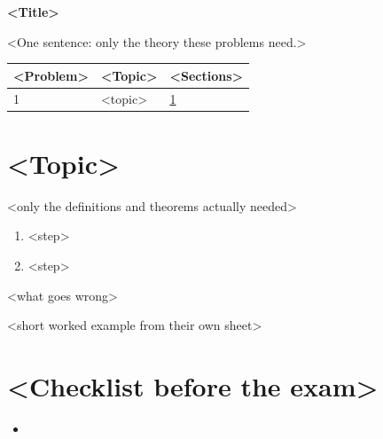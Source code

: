 \documentclass[11pt,a4paper]{article}
\begin{document}
{\LARGE\bfseries\sffamily\color{accent} <Title>}\par\smallskip
<One sentence: only the theory these problems need.>

\begin{keyres}
\begin{tabularx}{\linewidth}{lXl}\toprule
<Problem> & <Topic> & <Sections>\\\midrule
1 & <topic> & \ref{s:one}\\\bottomrule
\end{tabularx}
\end{keyres}

\section{<Topic>}\label{s:one}
\begin{defn}
<only the definitions and theorems actually needed>
\end{defn}
\begin{method}
\begin{enumerate}\item <step>\item <step>\end{enumerate}
\end{method}
\begin{trap}
<what goes wrong>
\end{trap}
\begin{exmpl}[ (<Problem 1>)]
<short worked example from their own sheet>
\end{exmpl}

\section*{<Checklist before the exam>}
\begin{itemize}\item <trap to check>\end{itemize}
\end{document}

